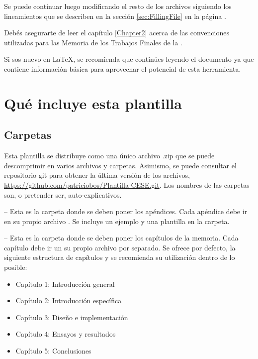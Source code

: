 Se puede continuar luego modificando el resto de los archivos siguiendo los
lineamientos que se describen en la sección \ref{sec:FillingFile} en la página
\pageref{sec:FillingFile}.

Debés asegurarte de leer el capítulo \ref{Chapter2} acerca de las convenciones
utilizadas para las Memoria de los Trabajos Finales de la \degreename.

Si sos nuevo en \LaTeX{}, se recomienda que continúes leyendo el documento ya
que contiene información básica para aprovechar el potencial de esta
herramienta.


\section{Qué incluye esta plantilla}

\subsection{Carpetas}

Esta plantilla se distribuye como una único archivo .zip que se puede
descomprimir en varios archivos y carpetas. Asimismo, se puede consultar el
repositorio git para obtener la última versión de los archivos,
\url{https://github.com/patriciobos/Plantilla-CESE.git}. Los nombres de las
carpetas son, o pretender ser, auto-explicativos.

 -- Esta es la carpeta donde se deben poner los apéndices. Cada apéndice debe ir en su propio archivo . Se incluye un ejemplo y una plantilla en la carpeta.

 -- Esta es la carpeta donde se deben poner los capítulos de la memoria. Cada capítulo debe ir un su propio archivo  por separado.  Se ofrece por defecto, la siguiente estructura de capítulos y se recomienda su utilización dentro de lo posible:

\begin{itemize}
      \item Capítulo 1: Introducción general
      \item Capítulo 2: Introducción específica
      \item Capítulo 3: Diseño e implementación
      \item Capítulo 4: Ensayos y resultados
      \item Capítulo 5: Conclusiones

\end{itemize}

